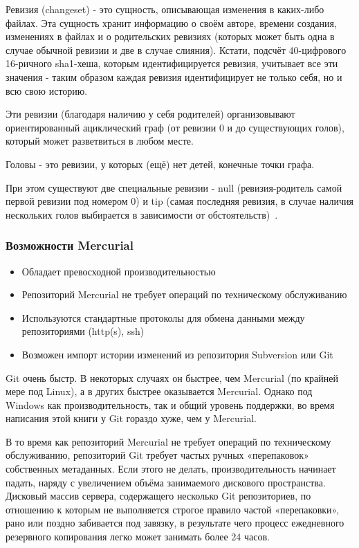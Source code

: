 \documentclass{../industrial-development}
\begin{document}
\lecturenotes

Ревизия (changeset) - это сущность, описывающая изменения в каких-либо файлах. Эта сущность хранит информацию о своём авторе, времени создания, изменениях в файлах и о родительских ревизиях (которых может быть одна в случае обычной ревизии и две в случае слияния). Кстати, подсчёт 40-цифрового 16-ричного sha1-хеша, которым идентифицируется ревизия, учитывает все эти значения - таким образом каждая ревизия идентифицирует не только себя, но и всю свою историю.

Эти ревизии (благодаря наличию у себя родителей) организовывают ориентированный ациклический граф (от ревизии 0 и до существующих голов), который может разветвиться в любом месте.

Головы - это ревизии, у которых (ещё) нет детей, конечные точки графа.

При этом существуют две специальные ревизии - null (ревизия-родитель самой первой ревизии под номером 0) и tip (самая последняя ревизия, в случае наличия нескольких голов выбирается в зависимости от обстоятельств)~\cite{MercurialSolovyov}.

\begin{frame} \frametitle{Возможности Mercurial}
  
  \begin{itemize}
  \item Обладает превосходной производительностью
  \item Репозиторий Mercurial не требует операций по техническому обслуживанию
  \item Используются стандартные протоколы для обмена данными между репозиториями (http(s), ssh)
  \item Возможен импорт истории изменений из репозитория Subversion или Git
  \end{itemize}
\end{frame}

\lecturenotes

Git очень быстр. В некоторых случаях он быстрее, чем Mercurial (по крайней мере под Linux), а в других быстрее оказывается Mercurial. Однако под Windows как производительность, так и общий уровень поддержки, во время написания этой книги у Git гораздо хуже, чем у Mercurial.

В то время как репозиторий Mercurial не требует операций по техническому обслуживанию, репозиторий Git требует частых ручных «перепаковок» собственных метаданных. Если этого не делать, производительность начинает падать, наряду с увеличением объёма занимаемого дискового пространства. Дисковый массив сервера, содержащего несколько Git репозиториев, по отношению к которым не выполняется строгое правило частой «перепаковки», рано или поздно забивается под завязку, в результате чего процесс ежедневного резервного копирования легко может занимать более 24 часов. 
\end{document}

